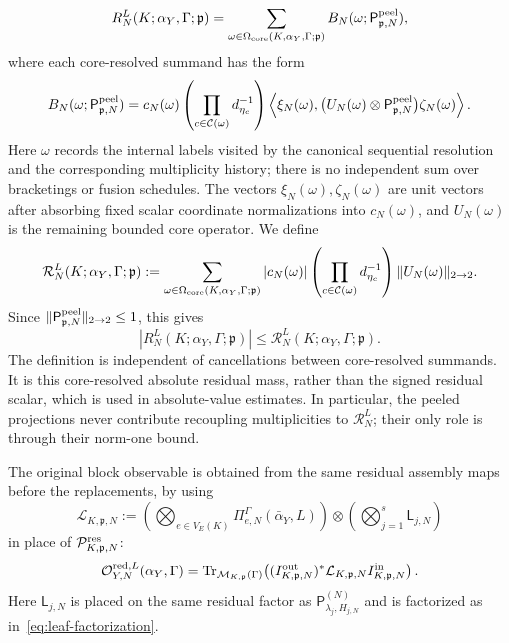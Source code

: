 \documentclass[11pt,a4paper,reqno]{amsart}
\theoremstyle{definition}
\theoremstyle{remark}
\newcommand\Tr{{\mathrm{Tr}}}
\begin{document}
\[
R_N^L(K;\alpha_Y,\Gamma;\mathfrak p)
=
\sum_{\omega\in\Omega_{\rm core}(K,\alpha_Y,\Gamma;\mathfrak p)}
B_N(\omega;\mathsf P^{\rm peel}_{\mathfrak p,N}),
\]
where each core-resolved summand has the form
\[
B_N(\omega;\mathsf P^{\rm peel}_{\mathfrak p,N})
=
c_N(\omega)
\left(\prod_{c\in\mathcal C(\omega)}d_{\eta_c}^{-1}\right)
\left\langle
\xi_N(\omega),
\bigl(U_N(\omega)\otimes\mathsf P^{\rm peel}_{\mathfrak p,N}\bigr)
\zeta_N(\omega)
\right\rangle .
\]
Here $\omega$ records the internal labels visited by the canonical sequential resolution and the corresponding multiplicity history; there is no independent sum over bracketings or fusion schedules.  The vectors $\xi_N(\omega),\zeta_N(\omega)$ are unit vectors after absorbing fixed scalar coordinate normalizations into $c_N(\omega)$, and $U_N(\omega)$ is the remaining bounded core operator.  We define
\begin{equation}\label{eq:absolute-residual-mass}
\mathcal R_N^L(K;\alpha_Y,\Gamma;\mathfrak p)
:=
\sum_{\omega\in\Omega_{\rm core}(K,\alpha_Y,\Gamma;\mathfrak p)}
|c_N(\omega)|
\left(\prod_{c\in\mathcal C(\omega)}d_{\eta_c}^{-1}\right)
\|U_N(\omega)\|_{2\to2} .
\end{equation}
Since $\|\mathsf P^{\rm peel}_{\mathfrak p,N}\|_{2\to2}\le1$, this gives
\[
|R_N^L(K;\alpha_Y,\Gamma;\mathfrak p)|
\le
\mathcal R_N^L(K;\alpha_Y,\Gamma;\mathfrak p).
\]
The definition is independent of cancellations between core-resolved summands.  It is this core-resolved absolute residual mass, rather than the signed residual scalar, which is used in absolute-value estimates.  In particular, the peeled projections never contribute recoupling multiplicities to $\mathcal R_N^L$; their only role is through their norm-one bound.

The original block observable is obtained from the same residual assembly maps before the replacements, by using
\[
\mathcal L_{K,\mathfrak p,N}
:=
\left(\bigotimes_{e\in V_E(K)}
\Pi^\Gamma_{e,N}(\bar\alpha_Y,L)\right)
\otimes
\left(\bigotimes_{j=1}^s
\mathsf L_{j,N}\right)
\]
in place of $\mathcal P^{\rm res}_{K,\mathfrak p,N}$:
\begin{equation}\label{eq:block-observable-leaf-factorization}
\mathcal O_{Y,N}^{\mathrm{red},L}(\alpha_Y,\Gamma)
=
\Tr_{\mathcal M_{K,\mathfrak p}(\Gamma)}\!\left(
(I^{\rm out}_{K,\mathfrak p,N})^*
\mathcal L_{K,\mathfrak p,N}
I^{\rm in}_{K,\mathfrak p,N}
\right).
\end{equation}
Here $\mathsf L_{j,N}$ is placed on the same residual factor as $\mathsf P_{\lambda_j,H_{j,N}}^{(N)}$ and is factorized as in~\eqref{eq:leaf-factorization}.
\end{document}
